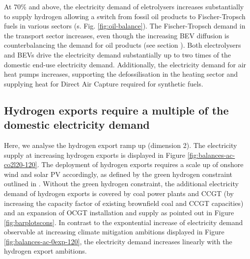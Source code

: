At 70\% and above, the electricity demand of eletrolysers increases substantially to supply hydrogen allowing a switch from fossil oil products to Fischer-Tropsch fuels in various sectors (s. Fig. \ref{fig:oil-balance}). 
The Fischer-Tropsch demand in the transport sector increases, even though the increasing BEV diffusion is counterbalancing the demand for oil products (see  section ). 
Both electrolysers and BEVs drive the electricity demand substantially up to two times of the domestic end-use electricity demand. 
Additionally, the electricity demand for air heat pumps increases, supporting the defossilisation in the heating sector and supplying heat for Direct Air Capture required for synthetic fuels.



\subsection*{Hydrogen exports require a multiple of the domestic electricity demand}
\label{subsec:increase_h2}

Here, we analyse the hydrogen export ramp up (dimension 2). The electricity supply at increasing hydrogen exports is displayed in Figure \ref{fig:balances-ac-co2l20-120}. The deployment of hydrogen exports requires a scale up of onshore wind and solar PV accordingly, as defined by the green hydrogen constraint outlined in .
Without the green hydrogen constraint, the additional electricity demand of hydrogen exports is covered by coal power plants and CCGT (by increasing the capacity factor of existing brownfield coal and CCGT capacities) and an expansion of OCGT installation and supply as pointed out in Figure \ref{fig:barplotscons}.
In contrast to the expontential increase of electricity demand observable at increasing climate mitigation ambitions displayed in Figure \ref{fig:balances-ac-0exp-120}, the electricity demand increases linearly with the hydrogen export ambitions.


